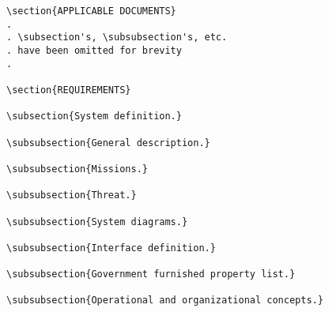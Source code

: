 \begin{itemize}
\begin{small}
\begin{verbatim}
\section{APPLICABLE DOCUMENTS}
.
. \subsection's, \subsubsection's, etc.
. have been omitted for brevity
.

\section{REQUIREMENTS}

\subsection{System definition.}

\subsubsection{General description.}

\subsubsection{Missions.}

\subsubsection{Threat.}

\subsubsection{System diagrams.}

\subsubsection{Interface definition.}

\subsubsection{Government furnished property list.}

\subsubsection{Operational and organizational concepts.}


\end{verbatim}
\end{small}
\end{itemize}
